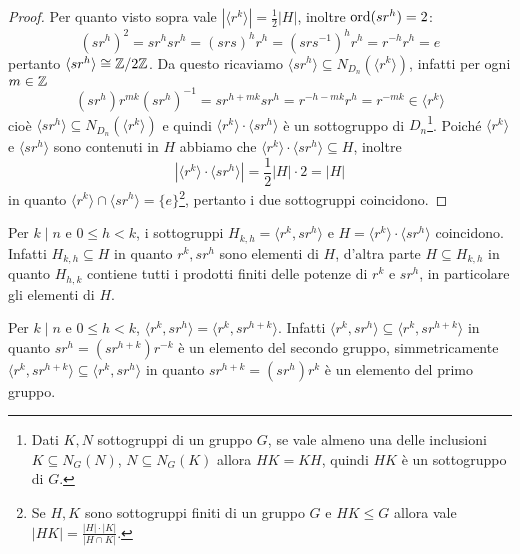 \documentclass[11pt]{scrartcl}
\begin{document}
\begin{proof}
    Per quanto visto sopra vale $|\langle r^k\rangle| = 
    \displaystyle\frac 1 2|H|$, inoltre $\operatorname{ord}(sr^h) = 2$:
    \[
        (sr^h)^2 = sr^hsr^h = (srs)^hr^h = (srs^{-1})^hr^h = r^{-h}r^h = e
    \]
    pertanto $\langle sr^h\rangle \cong \mathbb{Z}/{2}\mathbb{Z}$. Da questo ricaviamo $\langle sr^h\rangle
    \subseteq N_{D_n}(\langle r^k\rangle)$, infatti per ogni $m \in \mathbb Z$ 
    \[
        (sr^h)r^{mk}(sr^h)^{-1} = sr^{h + mk} sr^h = r^{-h-mk}r^h = r^{-mk}
        \in \langle r^k \rangle
    \]
    cioè $\langle sr^h\rangle \subseteq N_{D_n}(\langle r^k\rangle)$ e quindi
    $\langle r^k\rangle\cdot\langle sr^h\rangle$ è un sottogruppo di $D_n$\footnote
    {Dati $K, N$ sottogruppi
    di un gruppo $G$, se vale almeno una delle inclusioni $K \subseteq N_G(N)$,
    $N \subseteq N_G(K)$ allora $HK = KH$, quindi $HK$ è un sottogruppo di $G$.}.
    Poiché $\langle r^k\rangle$ e $\langle sr^h\rangle$ sono contenuti in $H$
    abbiamo che $\langle r^k\rangle\cdot\langle sr^h\rangle \subseteq H$, inoltre
    \[|\langle r^k\rangle\cdot\langle sr^h\rangle| = \displaystyle\frac 1 2 |H|\cdot 2 = |H|\]
    in quanto $\langle r^k\rangle\cap\langle sr^h\rangle = \{e\}$\footnote{
        Se $H, K$ sono sottogruppi finiti di un gruppo $G$ e $HK\leqslant G$ allora
        vale $|HK| = \displaystyle\frac{|H|\cdot|K|}{|H\cap K|}$.
    }, pertanto 
    i due sottogruppi coincidono.
\end{proof}

\begin{remark}
    Per $k \mid n$ e $0\leqslant h < k$, i sottogruppi $H_{k, h} = \langle r^k, sr^h\rangle$
    e $H = \langle r^k\rangle\cdot\langle sr^h\rangle$ coincidono. Infatti 
    $H_{k, h}\subseteq H$ in quanto $r^k, sr^h$ sono elementi di $H$, 
    d'altra parte $H \subseteq H_{k, h}$ in quanto $H_{h, k}$ contiene tutti i 
    prodotti finiti delle potenze di $r^k$ e $sr^h$, in particolare gli elementi di $H$.
\end{remark}

\begin{remark}
    Per $k \mid n$ e $0\leqslant h < k$, $\langle r^k, sr^h\rangle = 
    \langle r^k, sr^{h + k}\rangle$. Infatti $\langle r^k, sr^h\rangle \subseteq
    \langle r^k, sr^{h + k}\rangle$ in quanto $sr^h = (sr^{h + k})r^{-k}$ è
    un elemento del secondo gruppo, simmetricamente $\langle r^k, sr^{h + k}\rangle
    \subseteq \langle r^k, sr^h\rangle$ in quanto $sr^{h + k} = (sr^h)r^k$ è un
    elemento del primo gruppo.
\end{remark}
\end{document}
